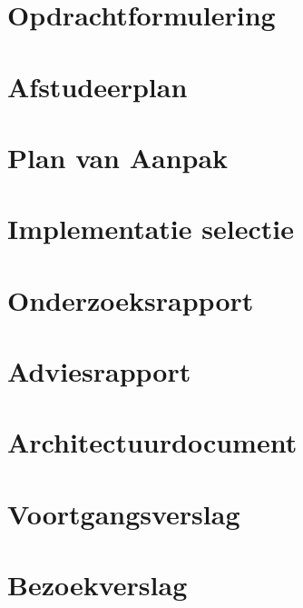\begin{appendices}
  \renewcommand\thesection{\Roman{section}}
  \renewcommand\thesubsection{\thesection.\roman{subsection}}

  \section{Opdrachtformulering}\label{appendix:opdrachtformulering}
  

  \section{Afstudeerplan}\label{appendix:afstudeerplan}
  

  \section{Plan van Aanpak}
  \label{appendix:pva}

  \section{Implementatie selectie}
  
  
  \section{Onderzoeksrapport}\label{appendix:onderzoeksrapport}
  

  \section{Adviesrapport}\label{appendix:adviesrapport}
  

  \section{Architectuurdocument}\label{appendix:architectuur}
  
    
  \section{Voortgangsverslag}
  

  \section{Bezoekverslag}
  
\end{appendices}